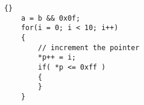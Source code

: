 \documentclass{article}
\begin{document}
\lstset{language=c++}
\lstset{commentstyle=\textit}

\begin{lstlisting}[frame=tb]{}
    a = b && 0x0f;
    for(i = 0; i < 10; i++)
    {
        // increment the pointer
        *p++ = i;
        if( *p <= 0xff )
        {
        }
    }
\end{lstlisting}
\end{document}
